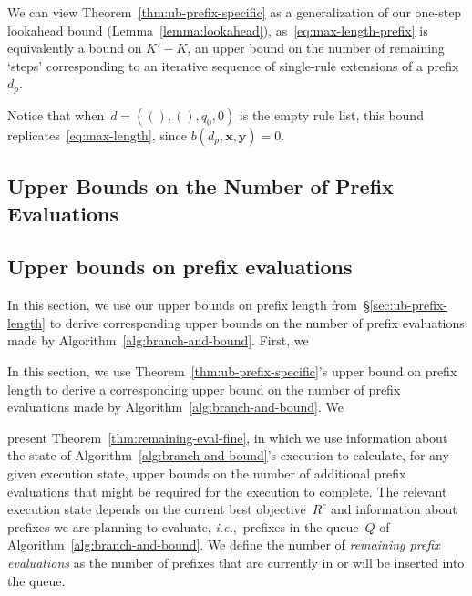 \documentclass[twoside,11pt]{article}
\def\ie{{\it i.e.},~}
\newcommand{\x}{\mathbf{x}}
\newcommand{\y}{\mathbf{y}}
\def\RL{{d}}
\def\Prefix{d_p}
\def\CurrentObj{{R^c}}
\def\Queue{Q}
\begin{document}
We can view Theorem~\ref{thm:ub-prefix-specific} as a generalization
of our one-step lookahead bound (Lemma~\ref{lemma:lookahead}),
as~\eqref{eq:max-length-prefix} is equivalently a bound on ${K' - K}$,
an upper bound on the number of remaining `steps' corresponding to
an iterative sequence of single-rule extensions of a prefix~$\Prefix$.
%
\begin{arxiv}
Notice that when~${\RL = ((), (), q_0, 0)}$ is the empty rule list,
this bound replicates~\eqref{eq:max-length}, since ${b(\Prefix, \x, \y) = 0}$.
\end{arxiv}

\begin{arxiv}
\subsection{Upper Bounds on the Number of Prefix Evaluations}
\end{arxiv}
\begin{kdd}
\subsection{Upper bounds on prefix evaluations}
\end{kdd}
\label{sec:ub-size}

\begin{arxiv}
In this section, we use our upper bounds on prefix length
from~\S\ref{sec:ub-prefix-length} to derive corresponding
upper bounds on the number of prefix evaluations made by
Algorithm~\ref{alg:branch-and-bound}.
%
First, we
\end{arxiv}
\begin{kdd}
In this section, we use Theorem~\ref{thm:ub-prefix-specific}'s
upper bound on prefix length to derive a corresponding
upper bound on the number of prefix evaluations made by
Algorithm~\ref{alg:branch-and-bound}.
%
We
\end{kdd}
present Theorem~\ref{thm:remaining-eval-fine},
in which we use information about the state of
Algorithm~\ref{alg:branch-and-bound}'s execution
to calculate, for any given execution state,
upper bounds on the number of additional prefix evaluations that might
be required for the execution to complete.
%
The relevant execution state depends on the current
best objective~$\CurrentObj$ and information about
prefixes we are planning to evaluate, \ie prefixes in the
queue~$\Queue$ of Algorithm~\ref{alg:branch-and-bound}.
%
We define the number of \emph{remaining prefix evaluations} as the number of
prefixes that are currently in or will be inserted into the queue.
\end{document}
